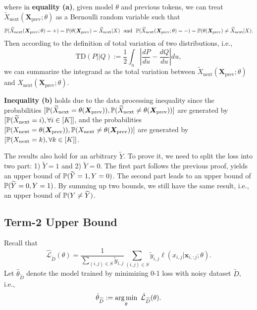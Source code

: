 where in \textbf{equality (a)}, given model $\theta$ and previous tokens, we can treat $\widetilde X_{\text{next}}(\bm X_{\text{prev}}; \theta)$ as a Bernoulli random variable such that
\[
\mathbb P(\widetilde{X}_{\text{next}}(\bm X_{\text{prev}};\theta) = +) = \mathbb P({\theta(\bm X_{\text{prev}})=\widetilde X_{\text{next}} }| X) \text{~~and~~} \mathbb P(\widetilde{X}_{\text{next}}(\bm X_{\text{prev}}; \theta) = -) = \mathbb P({\theta(\bm X_{\text{prev}})\ne \widetilde X_{\text{next}} }| X). 
\]
Then according to the definition of total variation of two distributions, i.e.,
\[
\text{TD}(P||Q) := \frac{1}{2} \int_u |\frac{dP}{du} - \frac{dQ}{du}|du,
\]
we can summarize the integrand as the total variation between $\widetilde{X}_{\text{next}}(\bm X_{\text{prev}};\theta)$ and ${X}_{\text{next}}(\bm X_{\text{prev}};\theta)$.


\textbf{Inequality (b)} holds due to the data processing inequality since the probabilities $[\mathbb P(\widetilde X_{\text{next}}=\theta(\bm X_{\text{prev}})), \mathbb P(\widetilde X_{\text{next}}\ne \theta(\bm X_{\text{prev}}))]$ are generated by $[\mathbb P(\widetilde X_{\text{next}}=i), \forall i\in[K]]$, and the probabilities $[\mathbb P(X_{\text{next}}=\theta(\bm X_{\text{prev}})), \mathbb P(X_{\text{next}}\ne \theta(\bm X_{\text{prev}}))]$ are generated by $[\mathbb P(X_{\text{next}}=k), \forall k\in[K]]$.


The results also hold for an arbitrary $\widetilde Y$. To prove it, we need to split the loss into two part: 1) $\widetilde Y=1$ and 2) $\widetilde Y=0$.
The first part follows the previous proof, yields an upper bound of $\mathbb P(\widetilde Y=1, Y=0)$. The second part leads to an upper bound of $\mathbb P(\widetilde Y=0, Y=1)$. By summing up two bounds, we still have the same result, i.e., an upper bound of $\mathbb P(Y\ne \widetilde Y)$.

\subsection{Term-2 Upper Bound}\label{appendix:Term2_ub}

Recall that 
$$
\widehat {\mathcal{L}}_{\widetilde D}(\theta) =  \frac{1}{\sum_{(i,j)\in S} \tilde y_{i,j}} \sum_{(i,j)\in S} \tilde y_{i,j} \ell(x_{i,j} | \bm x_{i,:j}; \theta).
$$
Let $\hat \theta_{\widetilde D}$ denote the model trained by minimizing 0-1 loss with noisy dataset ${\widetilde D}$, i.e., $$\hat \theta_{\widetilde D}:=\operatorname*{arg\,min}_{\theta}~ \hat {\mathcal L}_{\widetilde D}(\theta).$$

